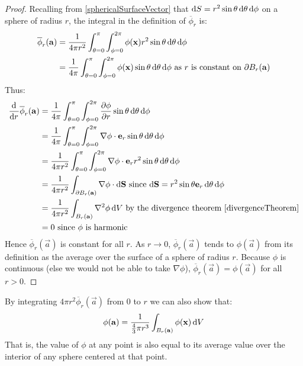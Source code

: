 \documentclass[../main.tex]{subfiles}
\begin{document}
\begin{proof}
  Recalling from \cref{sphericalSurfaceVector} that $\d{S} = r^2 \sin \theta \d{\theta}\d{\phi}$ on a sphere of radius $r$, the integral in the definition of $\overline{\phi}_r$ is:
  \begin{align*}
    \overline{\phi}_r(\vec{a}) &= \frac{1}{4\pi r^2} \int_{\theta=0}^{\pi} \int_{\phi=0}^{2\pi} \phi(\vec{x})r^2\sin\theta \d{\theta} \d{\phi} \\
                               &= \frac{1}{4\pi} \int_{\theta = 0}^{\pi} \int_{\phi = 0}^{2\pi} \phi(\vec{x}) \sin\theta \d{\theta} \d{\phi} \text{ as $r$ is constant on $\partial B_r(\vec{a})$} \\
  \end{align*}
  Thus:
  \begin{align*}
    \deriv{}{r}\overline{\phi}_r(\vec{a}) &= \frac{1}{4\pi}\int_{\theta = 0}^{\pi} \int_{\phi = 0}^{2\pi} \pderiv{\phi}{r} \sin\theta \d{\theta} \d{\phi} \\
                                          &= \frac{1}{4\pi}\int_{\theta = 0}^{\pi} \int_{\phi = 0}^{2\pi} \nabla \phi \cdot \vec{e}_r \sin\theta \d{\theta} \d{\phi} \\
                                          &= \frac{1}{4\pi r^2}\int_{\theta = 0}^{\pi} \int_{\phi = 0}^{2\pi} \nabla \phi \cdot \vec{e}_r r^2 \sin \theta \d{\theta} \d{\phi} \\
                                          &= \frac{1}{4\pi r^2} \int_{\partial B_r(\vec{a})} \nabla \phi \cdot \d{\vec{S}} \text{ since $\d{\vec{S}} = r^2\sin\theta \vec{e}_r \d{\theta}\d{\phi}$} \\
                                          &= \frac{1}{4\pi r^2} \int_{B_r(\vec{a})} \nabla^2 \phi \d{V} \text{ by the divergence theorem \cref{divergenceTheorem}} \\
                                          &= 0 \text{ since $\phi$ is harmonic}
  \end{align*}
  Hence $\overline{\phi}_r(\vec{a})$ is constant for all $r$.
  As $r \to 0$, $\overline{\phi}_r(\vec{a})$ tends to $\phi(\vec{a})$ from its definition as the average over the surface of a sphere of radius $r$.
  Because $\phi$ is continuous (else we would not be able to take $\nabla \phi$), $\overline{\phi}_r(\vec{a}) = \phi(\vec{a})$ for all $r > 0$.
\end{proof}
\begin{remark}
  By integrating $4\pi r^2 \overline{\phi}_r(\vec{a})$ from 0 to $r$ we can also show that:
  \[
    \phi(\vec{a}) = \frac{1}{\frac{4}{3}\pi r^3} \int_{B_r(\vec{a})} \phi(\vec{x}) \d{V}
  \]
  That is, the value of $\phi$ at any point is also equal to its average value over the interior of any sphere centered at that point.
\end{remark}
\end{document}
